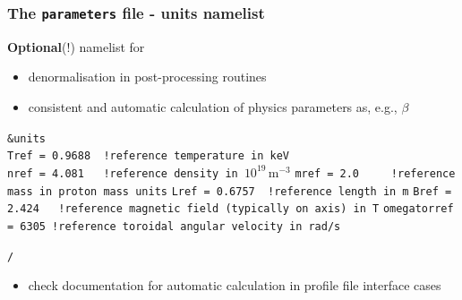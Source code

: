 \documentclass[9pt]{beamer}
\begin{document}
\begin{frame}[fragile]
  \frametitle{The {\tt parameters} file - units namelist}

\begin{block}

{\bf Optional}(!) namelist for
\begin{itemize}
 \item denormalisation in post-processing routines
 \item consistent and automatic calculation of physics parameters as, e.g., $\beta$
\end{itemize}

\begin{block}

\verb|&units|\\
\verb|Tref = 0.9688  !reference temperature in keV|\\
\verb|nref = 4.081   !reference density in |$10^{19}\,\textrm{m}^{-3}$
\verb|mref = 2.0     !reference mass in proton mass units|
\verb|Lref = 0.6757  !reference length in m|
\verb|Bref = 2.424   !reference magnetic field (typically on axis) in T|
\verb|omegatorref = 6305 !reference toroidal angular velocity in rad/s|

\verb|/|
\end{block}
\begin{itemize}
 \item check documentation for automatic calculation in profile file interface cases
\end{itemize}

\end{block}

\end{frame}

\end{document}
